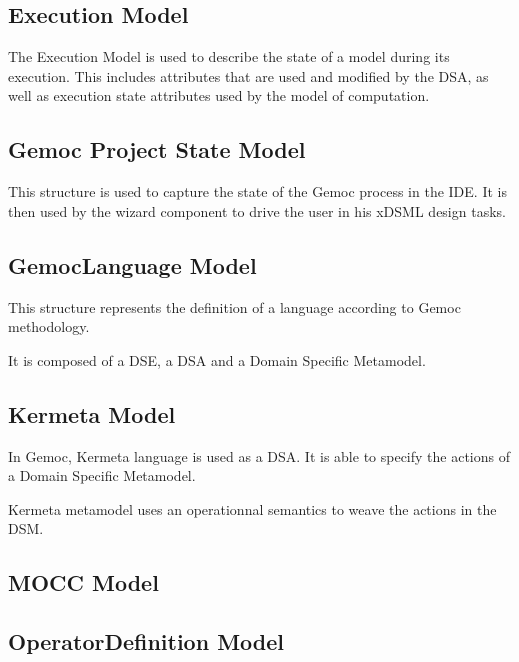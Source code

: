 \documentclass{gemoc} %
\begin{document}

\subsection{Execution Model}
The Execution Model is used to describe the state of a model during its execution. This includes attributes that are used and modified by the DSA, as well as execution state attributes used by the model of computation.

\subsection{Gemoc Project State Model}
This structure is used to capture the state of the Gemoc process in the IDE. It is then used by the wizard component to drive the user in his xDSML design tasks.

\subsection{GemocLanguage Model}
This structure represents the definition of a language according to Gemoc methodology.

It is composed of a DSE, a DSA and a Domain Specific Metamodel.


\subsection{Kermeta Model}
In Gemoc, Kermeta language is used as a DSA.
It is able to specify the actions of a Domain Specific Metamodel.

Kermeta metamodel uses an operationnal semantics to weave the actions in the DSM.

\subsection{MOCC Model}


\subsection{OperatorDefinition Model}
\end{document}
